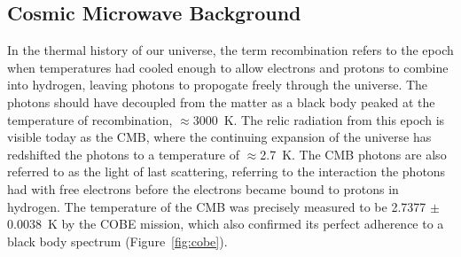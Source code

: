 \subsection{Cosmic Microwave Background}
\label{sec:cmb_dm}
In the thermal history of our universe, the term recombination refers to the epoch when temperatures had cooled enough to allow electrons and protons to combine into hydrogen, leaving photons to propogate freely through the universe. The photons should have decoupled from the matter as a black body peaked at the temperature of recombination,  $\approx$3000~K. The relic radiation from this epoch is visible today as the \ac{CMB}, where the continuing expansion of the universe has redshifted the photons to a temperature of $\approx$2.7~K. The \ac{CMB} photons are also referred to as the light of last scattering, referring to the interaction the photons had with free electrons before the electrons became bound to protons in hydrogen. The temperature of the \ac{CMB} was precisely measured to be 2.7377 $\pm$ 0.0038~K  by the COBE mission, which also confirmed its perfect adherence to a black body spectrum \cite{Smoot1999} (Figure~\ref{fig:cobe}).

